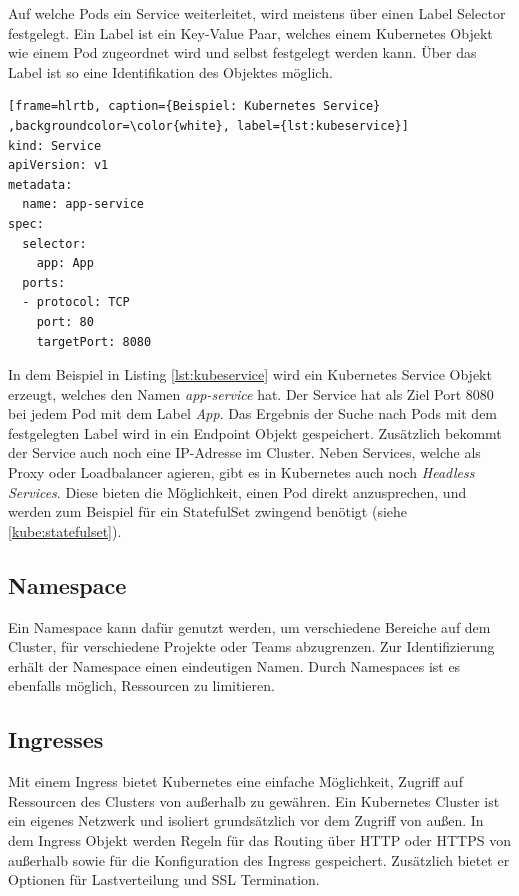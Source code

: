 Auf welche Pods ein Service weiterleitet, wird meistens über einen Label Selector festgelegt. Ein Label ist ein Key-Value Paar, welches einem Kubernetes Objekt wie einem Pod zugeordnet wird und selbst festgelegt werden kann. Über das Label ist so eine Identifikation des Objektes möglich.

\lstset{language=yaml}
\begin{lstlisting}[frame=hlrtb, caption={Beispiel: Kubernetes Service} ,backgroundcolor=\color{white}, label={lst:kubeservice}]
kind: Service
apiVersion: v1
metadata:
  name: app-service
spec:
  selector:
    app: App
  ports:
  - protocol: TCP
    port: 80
    targetPort: 8080
\end{lstlisting}
In dem Beispiel in Listing \ref{lst:kubeservice} wird ein Kubernetes Service Objekt erzeugt, welches den Namen \textit{app-service} hat. Der Service hat als Ziel Port 8080 bei jedem Pod mit dem Label \textit{App}. Das Ergebnis der Suche nach Pods mit dem festgelegten Label wird in ein Endpoint Objekt gespeichert. Zusätzlich bekommt der Service auch noch eine IP-Adresse im Cluster. Neben Services, welche als Proxy oder Loadbalancer agieren, gibt es in Kubernetes auch noch \textit{Headless Services}. Diese bieten die Möglichkeit, einen Pod direkt anzusprechen, und werden zum Beispiel für ein StatefulSet zwingend benötigt (siehe \ref{kube:statefulset}).

\subsection{Namespace}
Ein Namespace kann dafür genutzt werden, um verschiedene Bereiche auf dem Cluster, für verschiedene Projekte oder Teams abzugrenzen. Zur Identifizierung erhält der Namespace einen eindeutigen Namen. Durch Namespaces ist es ebenfalls möglich, Ressourcen zu limitieren.

\subsection{Ingresses}
Mit einem Ingress bietet Kubernetes eine einfache Möglichkeit, Zugriff auf Ressourcen des Clusters von außerhalb zu gewähren. Ein Kubernetes Cluster ist ein eigenes Netzwerk und isoliert grundsätzlich vor dem Zugriff von außen. In dem Ingress Objekt werden Regeln für das Routing über \ac{HTTP} oder \ac{HTTPS} von außerhalb sowie für die Konfiguration des Ingress gespeichert. Zusätzlich bietet er Optionen für Lastverteilung und SSL Termination. \medskip

